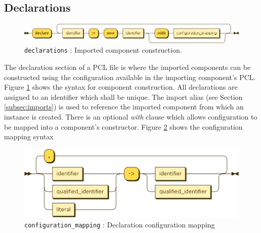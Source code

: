 \subsection{Declarations}\label{subsec:decls}
\begin{figure}[h!]
  \centering
    \includegraphics[scale=0.45]{chapters/compiler/diagrams/declarations}
  \caption{\texttt{declarations} : Imported component construction.}
  \label{fig:pcl-decls}
\end{figure}
The declaration section of a PCL file is where the imported components can be constructed using the configuration available in the importing component's PCL. Figure \ref{fig:pcl-decls} shows the syntax for component construction. All declarations are assigned to an identifier which shall be unique. The import alias (see Section \ref{subsec:imports}) is used to reference the imported component from which an instance is created. There is an optional \emph{with} clause which allows configuration to be mapped into a component's constructor. Figure \ref{fig:pcl-config-mapping} shows the configuration mapping syntax
\begin{figure}[h!]
  \centering
    \includegraphics[scale=\DiagramScale]{chapters/compiler/diagrams/configuration_mapping}
  \caption{\texttt{configuration\_mapping} : Declaration configuration mapping}
  \label{fig:pcl-config-mapping}
\end{figure}


